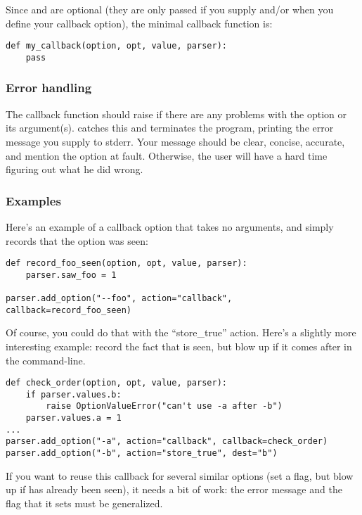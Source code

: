 Since  and  are optional (they are only passed
if you supply  and/or  when
you define your callback option), the minimal callback function is:

\begin{verbatim}
def my_callback(option, opt, value, parser):
    pass
\end{verbatim}

\subsubsection{Error handling\label{optparse-callback-error-handling}}

The callback function should raise  if
there are any problems with the option or its
argument(s).  catches this and terminates the
program, printing the error message you supply to stderr.  Your
message should be clear, concise, accurate, and mention the option at
fault.  Otherwise, the user will have a hard time figuring out what he
did wrong.

\subsubsection{Examples\label{optparse-callback-examples}}

Here's an example of a callback option that takes no arguments, and
simply records that the option was seen:

\begin{verbatim}
def record_foo_seen(option, opt, value, parser):
    parser.saw_foo = 1

parser.add_option("--foo", action="callback", callback=record_foo_seen)
\end{verbatim}

Of course, you could do that with the ``store_true'' action.  Here's a
slightly more interesting example: record the fact that
 is seen, but blow up if it comes after 
in the command-line.

\begin{verbatim}
def check_order(option, opt, value, parser):
    if parser.values.b:
        raise OptionValueError("can't use -a after -b")
    parser.values.a = 1
...
parser.add_option("-a", action="callback", callback=check_order)
parser.add_option("-b", action="store_true", dest="b")
\end{verbatim}

If you want to reuse this callback for several similar options (set a
flag, but blow up if  has already been seen), it needs
a bit of work: the error message and the flag that it sets must be
generalized.

